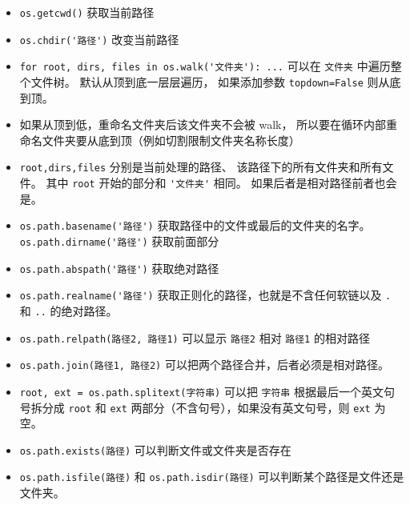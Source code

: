 
\begin{issues}
\issueDraft
\end{issues}

\begin{itemize}
\item \verb`os.getcwd()` 获取当前路径
\item \verb`os.chdir('路径')` 改变当前路径 
\item \verb`for root, dirs, files in os.walk('文件夹'): ...` 可以在 \verb`文件夹` 中遍历整个文件树。 默认从顶到底一层层遍历， 如果添加参数 \verb`topdown=False` 则从底到顶。
\item 如果从顶到低，重命名文件夹后该文件夹不会被 walk， 所以要在循环内部重命名文件夹要从底到顶（例如切割限制文件夹名称长度）
\item \verb`root,dirs,files` 分别是当前处理的路径、 该路径下的所有文件夹和所有文件。 其中 \verb`root` 开始的部分和 \verb`'文件夹'` 相同。 如果后者是相对路径前者也会是。
\item \verb`os.path.basename('路径')` 获取路径中的文件或最后的文件夹的名字。 \verb`os.path.dirname('路径')` 获取前面部分
\item \verb`os.path.abspath('路径')` 获取绝对路径
\item \verb`os.path.realname('路径')` 获取正则化的路径，也就是不含任何软链以及 \verb`.` 和 \verb`..` 的绝对路径。
\item \verb`os.path.relpath(路径2, 路径1)` 可以显示 \verb`路径2` 相对 \verb`路径1` 的相对路径
\item \verb`os.path.join(路径1, 路径2)` 可以把两个路径合并，后者必须是相对路径。
\item \verb`root, ext = os.path.splitext(字符串)` 可以把 \verb`字符串` 根据最后一个英文句号拆分成 \verb`root` 和 \verb`ext` 两部分（不含句号），如果没有英文句号，则 \verb`ext` 为空。
\item \verb`os.path.exists(路径)` 可以判断文件或文件夹是否存在
\item \verb`os.path.isfile(路径)` 和 \verb`os.path.isdir(路径)` 可以判断某个路径是文件还是文件夹。
\end{itemize}
